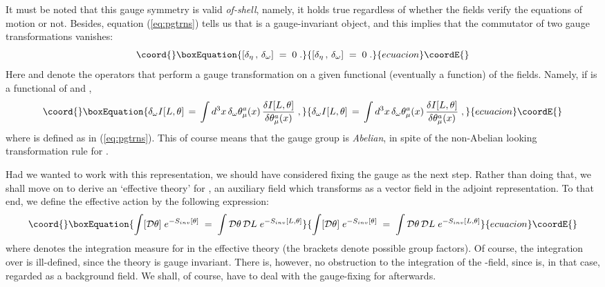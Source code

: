 \documentclass[a4paper,12pt]{article}
\begin{document}
It must be noted that this gauge symmetry is valid {\em of-shell},
namely, it holds true regardless of whether the fields verify the
equations of motion or not. Besides, equation (\ref{eq:pgtrns}) tells
us that \coordHE{} is a gauge-invariant object, and this implies that the
commutator of two gauge transformations vanishes:
\begin{equation}\coord{}\boxEquation{\label{eq:polcomm}
\left[\delta_\eta \,,\, \delta_\omega \right]\;=\; 0 \;.
}{\left[\delta_\eta \,,\, \delta_\omega \right]\;=\; 0 \;.
}{ecuacion}\coordE{}\end{equation}
Here \myHighlight{$\delta_\omega$}\coordHE{} and \myHighlight{$\delta_\eta$}\coordHE{} denote the operators that
perform a gauge transformation on a given functional (eventually a
function) of the fields.  Namely, if \coordHE{} is a functional of \coordHE{} and
\myHighlight{$\theta$}\coordHE{},
\begin{equation}\coord{}\boxEquation{
\delta_\omega I[L,\theta] \,=\, \int d^3x \, \delta_\omega
\theta_\mu^a (x) \, \frac{\delta I[L,\theta]}{\delta \theta_\mu^a (x)} 
\;,
}{
\delta_\omega I[L,\theta] \,=\, \int d^3x \, \delta_\omega
\theta_\mu^a (x) \, \frac{\delta I[L,\theta]}{\delta \theta_\mu^a (x)} 
\;,
}{ecuacion}\coordE{}\end{equation}
where \coordHE{} is defined as in (\ref{eq:pgtrns}).
This of course means that the gauge group is {\em Abelian}, in spite
of the non-Abelian looking transformation rule for \myHighlight{$\theta$}\coordHE{}.

Had we wanted to work with this representation, we should have
considered fixing the gauge as the next step. Rather than doing that,
we shall move on to derive an `effective theory' for \myHighlight{$\theta_\mu$}\coordHE{}, an
auxiliary field which transforms as a vector field in the adjoint
representation.  To that end, we define the effective action
\coordHE{} by the following expression:
\begin{equation}\coord{}\boxEquation{\label{eq:defst}
\int [{\mathcal D} \theta ] \; e^{ - S_{inv}[\theta] }
\;=\; \int {\mathcal D}\theta \, {\mathcal D}L \; e^{-S_{inv}[L,\theta]}
}{\int [{\mathcal D} \theta ] \; e^{ - S_{inv}[\theta] }
\;=\; \int {\mathcal D}\theta \, {\mathcal D}L \; e^{-S_{inv}[L,\theta]}
}{ecuacion}\coordE{}\end{equation}
where \coordHE{} denotes the integration measure for
\myHighlight{$\theta$}\coordHE{} in the effective theory (the brackets denote possible group
factors).  Of course, the integration over \myHighlight{$\theta_\mu$}\coordHE{} is
ill-defined, since the theory is gauge invariant. There is, however,
no obstruction to the integration of the \coordHE{}-field, since \myHighlight{$\theta_\mu$}\coordHE{}
is, in that case, regarded as a background field.  We shall, of
course, have to deal with the gauge-fixing for \coordHE{}
afterwards.
\end{document}
